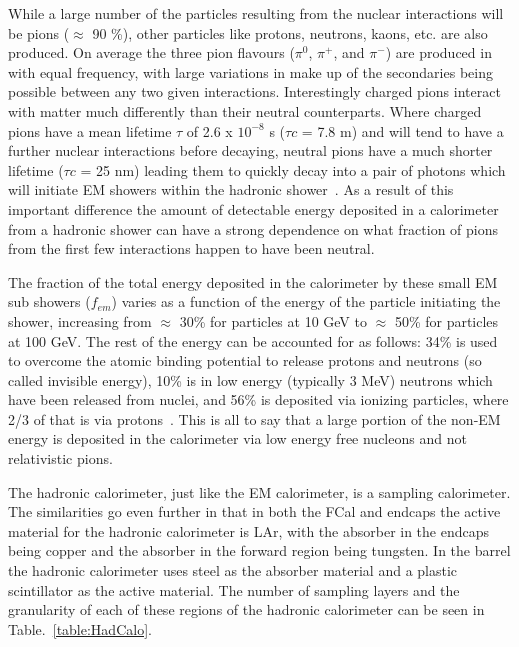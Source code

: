 While a large number of the particles resulting from the nuclear interactions will be pions ($\approx$ 90 \%), other particles like protons, neutrons, kaons, etc. are also produced.  
On average the three pion flavours ($\pi^0$, $\pi^{+}$, and $\pi^{-}$) are produced in with equal frequency, with large variations in make up of the secondaries being possible between any two given interactions.  
Interestingly charged pions interact with matter much differently than their neutral counterparts.  
Where charged pions have a mean lifetime $\tau$ of 2.6 x $10^{-8}$ s ($\tau c$ = 7.8 m) and will tend to have a further nuclear interactions before decaying, neutral pions have a much shorter lifetime ($\tau c$ = 25 nm) leading them to quickly decay into a pair of photons which will initiate EM showers within the hadronic shower~\cite{PDG}.  
As a result of this important difference the amount of detectable energy deposited in a calorimeter from a hadronic shower can have a strong dependence on what fraction of pions from the first few interactions happen to have been neutral.  

The fraction of the total energy deposited in the calorimeter by these small EM sub showers ($f_{em}$) varies as a function of the energy of the particle initiating the shower, increasing from $\approx$ 30\% for particles at 10 GeV to $\approx$ 50\% for particles at 100 GeV.  
The rest of the energy can be accounted for as follows: 34\% is used to overcome the atomic binding potential to release protons and neutrons (so called invisible energy), 10\% is in low energy (typically 3 MeV) neutrons which have been released from nuclei, and 56\% is deposited via ionizing particles, where 2/3 of that is via protons~\cite{Wigmans2008}.  
This is all to say that a large portion of the non-EM energy is deposited in the calorimeter via low energy free nucleons and not relativistic pions.  

The hadronic calorimeter, just like the EM calorimeter, is a sampling calorimeter.  
The similarities go even further in that in both the FCal and endcaps the active material for the hadronic calorimeter is LAr, with the absorber in the endcaps being copper and the absorber in the forward region being tungsten.  
In the barrel the hadronic calorimeter uses steel as the absorber material and a plastic scintillator as the active material.  
The number of sampling layers and the granularity of each of these regions of the hadronic calorimeter can be seen in Table.~\ref{table:HadCalo}. 

